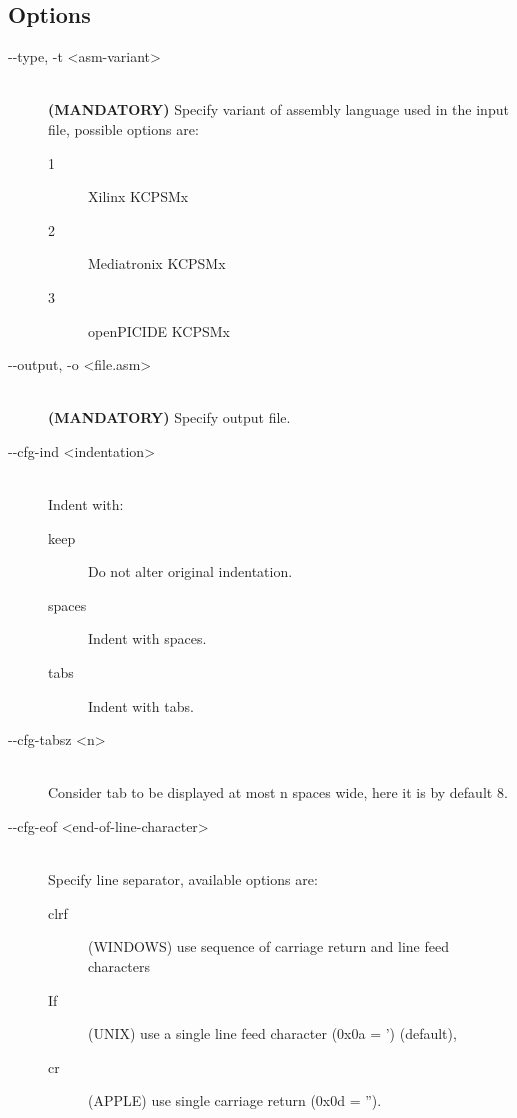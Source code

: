     \subsection{Options}
        \begin{description}
            \item[-{}-type, -t <asm-variant>]~\\
                \textbf{(MANDATORY)} Specify variant of assembly language used in the input file, possible options are:
                \begin{description}
                    \item [1] Xilinx KCPSMx
                    \item [2] Mediatronix KCPSMx
                    \item [3] openPICIDE KCPSMx
                \end{description}

            \item[-{}-output, -o <file.asm>]~\\
                \textbf{(MANDATORY)} Specify output file.

            \item[-{}-cfg-ind <indentation>]~\\
                Indent with:
                \begin{description}
                    \item [keep] Do not alter original indentation.
                    \item [spaces] Indent with spaces.
                    \item [tabs] Indent with tabs.
                \end{description}

            \item[-{}-cfg-tabsz <n>]~\\
                Consider tab to be displayed at most n spaces wide, here it is by default 8.

            \item[-{}-cfg-eof <end-of-line-character>]~\\
                Specify line separator, available options are:
                \begin{description}
                    \item [clrf] (WINDOWS) use sequence of carriage return and line feed characters
                    \item [If] (UNIX) use a single line feed character (0x0a = ') (default),
                    \item [cr] (APPLE) use single carriage return (0x0d = '').
                \end{description}


\end{description}

